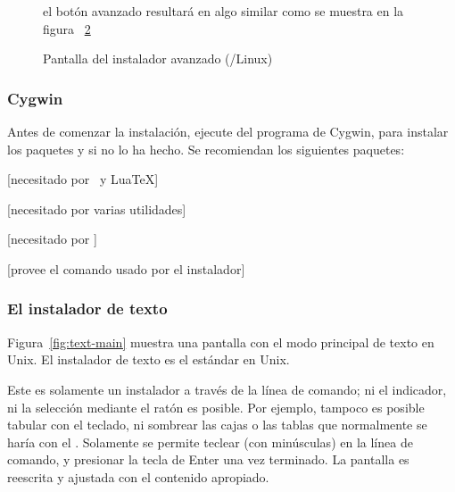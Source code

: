 \documentclass{article}
\begin{document}
\begin{figure}[tb]
\caption{el botón avanzado resultará en algo similar como se muestra en la figura ~\ref{fig:advanced-lnx}
\label{fig:basic-w32}}
\end{figure}

\begin{figure}[tb]
\caption{Pantalla del instalador avanzado \GUI{} (\GNU/Linux)}
\label{fig:advanced-lnx}
\end{figure}

\subsubsection{Cygwin}
\label{sec:cygwin}

Antes de comenzar la instalación, ejecute  del
programa de Cygwin, para instalar los paquetes  y
 si no lo ha hecho. Se recomiendan los siguientes
paquetes:
\begin{itemize*}
	\item {}[necesitado por \XeTeX\ y Lua\TeX]
	\item {} [necesitado por varias utilidades]
	\item {} [necesitado por ]
	\item {} [provee el comando  usado por el instalador]
\end{itemize*}

\subsubsection{El instalador de texto}

Figura~\ref{fig:text-main} muestra una pantalla con el modo principal
de texto en Unix. El instalador de texto es el estándar en Unix. 

Este es solamente un instalador a través de la línea de comando; ni el
indicador, ni la selección mediante el ratón es posible. Por ejemplo,
tampoco es posible tabular con el teclado, ni sombrear las cajas o las
tablas que normalmente se haría con el \GUI. Solamente se permite
teclear (con minúsculas) en la línea de comando, y presionar la tecla
de Enter una vez terminado. La pantalla es reescrita y ajustada con el
contenido apropiado. 
\end{document}
